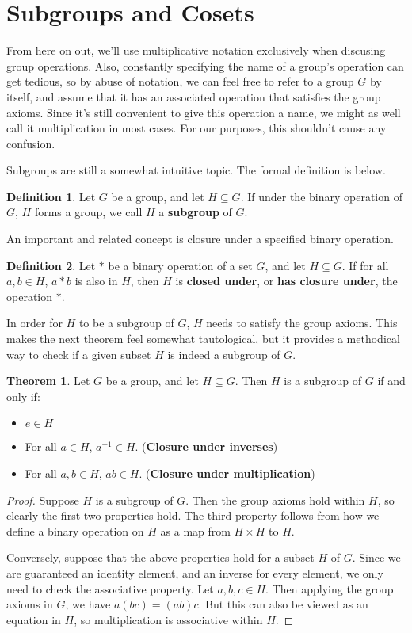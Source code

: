 \documentclass{article}
\newcommand{\inv}[1]{#1^{-1}}
\theoremstyle{definition}
\newtheorem{definition}{Definition}[section]
\newtheorem{theorem}{Theorem}[section]
\newenvironment{thm}
{\theoremstyle{definition}
\begin{theorem}}
{\end{theorem}}
\newenvironment{defn}
{\theoremstyle{definition}
\begin{definition}{}}
{\end{definition}}
\begin{document}
\section{Subgroups and Cosets}

From here on out, we'll use multiplicative notation exclusively when discusing group operations. Also, constantly specifying the name of a group's operation can get tedious, so by abuse of notation, we can feel free to refer to a group $G$ by itself, and assume that it has an associated operation that satisfies the group axioms. Since it's still convenient to give this operation a name, we might as well call it multiplication in most cases. For our purposes, this shouldn't cause any confusion.

Subgroups are still a somewhat intuitive topic. The formal definition is below.

\begin{defn}
Let $G$ be a group, and let $H \subseteq G$. If under the binary operation of $G$, $H$ forms a group, we call $H$ a \textbf{subgroup} of $G$.
\end{defn}

An important and related concept is closure under a specified binary operation.

\begin{defn}
Let $*$ be a binary operation of a set $G$, and let $H \subseteq G$. If for all $a, b \in H$, $a*b$ is also in $H$, then $H$ is \textbf{closed under}, or \textbf{has closure under}, the operation $*$.
\end{defn}

In order for $H$ to be a subgroup of $G$, $H$ needs to satisfy the group axioms. This makes the next theorem feel somewhat tautological, but it provides a methodical way to check if a given subset $H$ is indeed a subgroup of $G$.

\begin{thm}
Let $G$ be a group, and let $H \subseteq G$. Then $H$ is a subgroup of $G$ if and only if:
\begin{itemize}
    \item $e \in H$
    \item For all $a \in H$, $\inv{a} \in H$. (\textbf{Closure under inverses})
    \item For all $a, b \in H$, $ab \in H$. (\textbf{Closure under multiplication})
\end{itemize}
\end{thm}

\begin{proof}
Suppose $H$ is a subgroup of $G$. Then the group axioms hold within $H$, so clearly the first two properties hold. The third property follows from how we define a binary operation on $H$ as a map from $H \times H$ to $H$.

Conversely, suppose that the above properties hold for a subset $H$ of $G$. Since we are guaranteed an identity element, and an inverse for every element, we only need to check the associative property. Let $a, b, c \in H$. Then applying the group axioms in $G$, we have $a(bc) = (ab)c$. But this can also be viewed as an equation in $H$, so multiplication is associative within $H$.
\end{proof}
\end{document}
